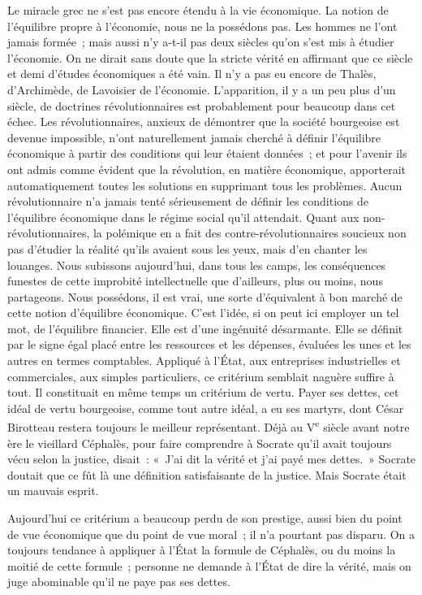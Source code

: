 \documentclass[french,twoside]{book} %
\begin{document}
Le miracle grec ne s'est pas encore étendu à la vie économique. La notion de l'équilibre propre à l'économie, nous ne la possédons pas. Les hommes ne l'ont jamais formée ; mais aussi n'y a-t-il pas deux siècles qu'on s'est mis à étudier l'économie. On ne dirait sans doute que la stricte vérité en affirmant que ce siècle et demi d'études économiques a été vain. Il n'y a pas eu encore de Thalès, d'Archimède, de Lavoisier de l'économie. L'apparition, il y a un peu plus d'un siècle, de doctrines révolutionnaires est probablement pour beaucoup dans cet échec. Les révolutionnaires, anxieux de démontrer que la société bourgeoise est devenue impossible, n'ont naturellement jamais cherché à définir l'équilibre économique à partir des conditions qui leur étaient données ; et pour l'avenir ils ont admis comme évident que la révolution, en matière économique, apporterait automatiquement toutes les solutions en supprimant tous les problèmes. Aucun révolutionnaire n'a jamais tenté sérieu­sement de définir les conditions de l'équilibre économique dans le régime social qu'il attendait. Quant aux non-révolutionnaires, la polémique en a fait des contre-révolutionnaires soucieux non pas d'étudier la réalité qu'ils avaient sous les yeux, mais d'en chanter les louanges. Nous subissons aujourd'hui, dans tous les camps, les conséquences funestes de cette improbité intellec­tuelle que d'ailleurs, plus ou moins, nous partageons. Nous possédons, il est vrai, une sorte d'équivalent à bon marché de cette notion d'équilibre écono­mique. C'est l'idée, si on peut ici employer un tel mot, de l'équilibre financier. Elle est d'une ingénuité désarmante. Elle se définit par le signe égal placé entre les ressources et les dépenses, évaluées les unes et les autres en termes comptables. Appliqué à l'État, aux entreprises industrielles et commerciales, aux simples particuliers, ce critérium semblait naguère suffire à tout. Il constituait en même temps un critérium de vertu. Payer ses dettes, cet idéal de vertu bourgeoise, comme tout autre idéal, a eu ses martyrs, dont César Birotteau restera toujours le meilleur représentant. Déjà au V\textsuperscript{e} siècle avant notre ère le vieillard Céphalès, pour faire comprendre à Socrate qu'il avait toujours vécu selon la justice, disait : « J'ai dit la vérité et j'ai payé mes dettes. » Socrate doutait que ce fût là une définition satisfaisante de la justice. Mais Socrate était un mauvais esprit.\par
Aujourd'hui ce critérium a beaucoup perdu de son prestige, aussi bien du point de vue économique que du point de vue moral ; il n'a pourtant pas disparu. On a toujours tendance à appliquer à l'État la formule de Céphalès, ou du moins la moitié de cette formule ; personne ne demande à l'État de dire la vérité, mais on juge abominable qu'il ne paye pas ses dettes.\par
\end{document}
